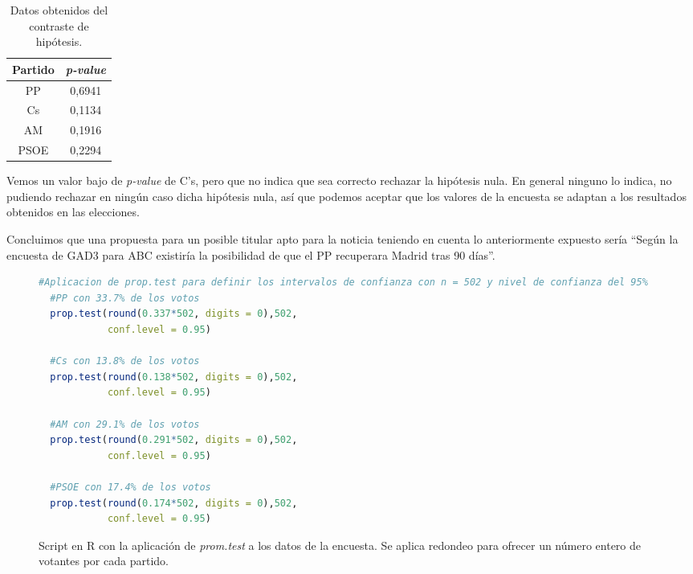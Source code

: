 \documentclass[11pt,a4paper]{article}
\begin{document}
\begin{table}[ht]
	\centering
	\begin{tabular}{cc}
	\toprule[0.4mm]
	Partido & \textit{p-value}\\
	\midrule
	PP & {\color{green} 0,6941} \\
	Cs & {\color{orange} 0,1134} \\
	AM & {\color{green} 0,1916} \\
	PSOE & {\color{green} 0,2294} \\
	\bottomrule[0.4mm]
	\end{tabular}
	\caption{Datos obtenidos del contraste de hipótesis.}
\label{tab:contraste}
\end{table}

Vemos un valor bajo de \textit{p-value} de C's, pero que no indica que sea correcto rechazar la hipótesis nula. En general ninguno lo indica, no pudiendo rechazar en ningún caso dicha hipótesis nula, así que podemos aceptar que los valores de la encuesta se adaptan a los resultados obtenidos en las elecciones.

Concluimos que una propuesta para un posible titular apto para la noticia teniendo en cuenta lo anteriormente expuesto sería ``Según la encuesta de GAD3 para ABC existiría la posibilidad de que el PP recuperara Madrid tras 90 días''.

\begin{figure}
\centering
\begin{lstlisting}[language=R]
  #Aplicacion de prop.test para definir los intervalos de confianza con n = 502 y nivel de confianza del 95%
  #PP con 33.7% de los votos
  prop.test(round(0.337*502, digits = 0),502,
            conf.level = 0.95)

  #Cs con 13.8% de los votos
  prop.test(round(0.138*502, digits = 0),502,
            conf.level = 0.95)

  #AM con 29.1% de los votos
  prop.test(round(0.291*502, digits = 0),502,
            conf.level = 0.95)

  #PSOE con 17.4% de los votos
  prop.test(round(0.174*502, digits = 0),502,
            conf.level = 0.95)
\end{lstlisting}
\caption{Script en R con la aplicación de \textit{prom.test} a los datos de la encuesta. Se aplica redondeo para ofrecer un número entero de votantes por cada partido.}
\label{fig:proptest}
\end{figure}
\end{document}
